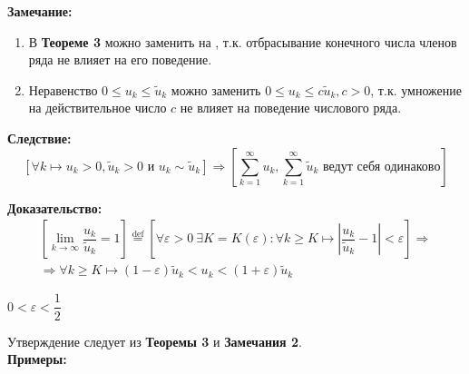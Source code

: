 \documentclass[a4paper,12pt]{article} %
\newcommand{\eqdef}{\stackrel{\mathrm{def}}{=}}
\newcommand{\N}{\mathbb{N}}
\newcommand{\useries}{\sum\limits_{k=1}^{\infty} u_k}
\begin{document}
\textbf{Замечание:}

\begin{enumerate}
	\item В \textbf{Теореме 3}  можно заменить на \fbox{$\forall k \geqslant k_0, k_0 \in \N$}, т.к. отбрасывание конечного числа членов ряда не влияет на его поведение.
	\item Неравенство $0 \leqslant u_k \leqslant \tilde{u}_k$ можно заменить $0 \leqslant u_k \leqslant c\tilde{u}_k, c > 0$, т.к. умножение на действительное число $c$ не влияет на поведение числового ряда.
\end{enumerate}

\textbf{Следствие:}
\[
	\left[\forall k \mapsto u_k > 0, \tilde{u}_k > 0 \text{ и } u_k \sim \tilde{u}_k \right] \Rightarrow \left[ \useries, \sum\limits_{k=1}^{\infty} \tilde{u}_k \text{ ведут себя одинаково} \right]
\]

\textbf{Доказательство:}
\begin{multline*}
	\left[ \lim\limits_{k \to \infty} \dfrac{u_k}{\tilde{u}_k} = 1 \right] \eqdef \left[ \forall \varepsilon > 0 \ \exists K = K(\varepsilon): \forall k \geqslant K \mapsto \left| {\dfrac{u_k}{\tilde{u}_k}} - 1 \right | < \varepsilon \right] \Rightarrow \\ \Rightarrow \forall k \geqslant K \mapsto (1 - \varepsilon)\tilde{u}_k < u_k < (1 + \varepsilon)\tilde{u}_k
\end{multline*}

$0 < \varepsilon < \dfrac{1}{2}$

Утверждение следует из \textbf{Теоремы 3} и \textbf{Замечания 2}.\\

\textbf{Примеры:}
\end{document}
